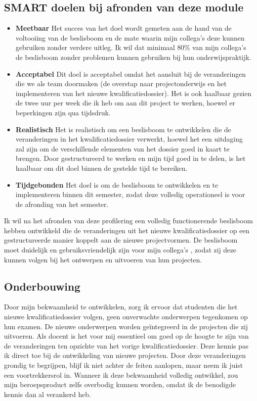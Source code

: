\subsection{SMART doelen bij afronden van deze module}
\begin{itemize}
    \item \textbf {Meetbaar}
Het succes van het doel wordt gemeten aan de hand van de voltooiing van de beslisboom en de mate waarin mijn collega's
 deze kunnen gebruiken zonder verdere uitleg. Ik wil dat minimaal 80\% van mijn collega's
 de beslisboom zonder problemen kunnen gebruiken bij hun onderwijspraktijk.

    \item \textbf {Acceptabel}
Dit doel is acceptabel omdat het aansluit bij de veranderingen die we als team doormaken (de overstap naar projectonderwijs en het implementeren van het nieuwe kwalificatiedossier). Het is ook haalbaar gezien de twee uur per week die ik heb om aan dit project te werken, hoewel er beperkingen zijn qua tijdsdruk.

    \item  \textbf {Realistisch}
Het is realistisch om een beslisboom te ontwikkelen die de veranderingen in het kwalificatiedossier verwerkt, hoewel het een uitdaging zal zijn om de verschillende elementen van het dossier goed in kaart te brengen. Door gestructureerd te werken en mijn tijd goed in te delen, is het haalbaar om dit doel binnen de gestelde tijd te bereiken.

    \item \textbf {Tijdgebonden}
Het doel is om de beslisboom te ontwikkelen en te implementeren binnen dit semester, zodat deze volledig operationeel is voor de afronding van het semester.
    
\end{itemize}

Ik wil na het afronden van deze profilering een volledig functionerende beslisboom hebben ontwikkeld die de veranderingen uit het nieuwe kwalificatiedossier op een gestructureerde manier koppelt aan de nieuwe projectvormen. De beslisboom moet duidelijk en gebruiksvriendelijk zijn voor mijn collega's
, zodat zij deze kunnen volgen bij het ontwerpen en uitvoeren van hun projecten.



\subsection{Onderbouwing}
Door mijn bekwaamheid te ontwikkelen, zorg ik ervoor dat studenten die het nieuwe kwalificatiedossier volgen, geen onverwachte onderwerpen tegenkomen op hun examen. De nieuwe onderwerpen worden geïntegreerd in de projecten die zij uitvoeren. Als docent is het voor mij essentieel om goed op de hoogte te zijn van de veranderingen ten opzichte van het vorige kwalificatiedossier. Deze kennis pas ik direct toe bij de ontwikkeling van nieuwe projecten. Door deze veranderingen grondig te begrijpen, blijf ik niet achter de feiten aanlopen, maar neem ik juist een voortrekkersrol in. Wanneer ik deze bekwaamheid volledig ontwikkel, zou mijn beroepsproduct zelfs overbodig kunnen worden, omdat ik de benodigde kennis dan al verankerd heb.


